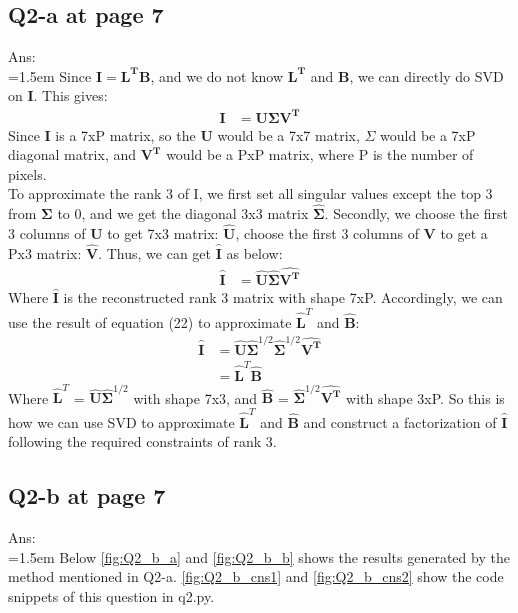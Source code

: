 \documentclass{article}
\begin{document}
	\subsection*{Q2-a at page 7}
	Ans:\\
	\hangindent=1.5em \hspace{1.5em} Since $\mathbf{I} = \mathbf{L^T}\mathbf{B}$, and we do not know $\mathbf{L^T}$ and $\mathbf{B}$, we can directly do SVD on $\mathbf{I}$. This gives:\\
	\begin{align}
		\mathbf{I} &= \mathbf{U}\mathbf{\Sigma}\mathbf{V^T}
	\end{align}
	Since $\mathbf{I}$ is a 7xP matrix, so the $\mathbf{U}$ would be a 7x7 matrix, $\Sigma$ would be a 7xP diagonal matrix, and $\mathbf{V^T}$ would be a PxP matrix, where P is the number of pixels.\\
	To approximate the rank 3 of I, we first set all singular values except the top 3 from $\mathbf{\Sigma}$ to 0, and we get the diagonal 3x3 matrix $\hat{\mathbf{\Sigma}}$. Secondly, we choose the first 3 columns of $\mathbf{U}$ to get 7x3 matrix: $\hat{\mathbf{U}}$, choose the first 3 columns of $\mathbf{V}$ to get a Px3 matrix: $\hat{\mathbf{V}}$. Thus, we can get $\hat{\mathbf{I}}$ as below:
	\begin{align}
		\hat{\mathbf{I}} &= \hat{\mathbf{U}}\hat{\mathbf{\Sigma}}\hat{\mathbf{V^T}}
	\end{align}
	Where $\hat{\mathbf{I}}$ is the reconstructed rank 3 matrix with shape 7xP. Accordingly, we can use the result of equation (22) to approximate $\hat{\mathbf{L}}^T$ and $\hat{\mathbf{B}}$:
	\begin{align}
		\hat{\mathbf{I}} &= \hat{\mathbf{U}}\hat{\mathbf{\Sigma}}^{1/2}\hat{\mathbf{\Sigma}}^{1/2}\hat{\mathbf{V^T}} \\
		                 &= \hat{\mathbf{L}}^T\hat{\mathbf{B}}
	\end{align}
	Where $\hat{\mathbf{L}}^T$ = $\hat{\mathbf{U}}\hat{\mathbf{\Sigma}}^{1/2}$ with shape 7x3, and  $\hat{\mathbf{B}}$ = $\hat{\mathbf{\Sigma}}^{1/2}\hat{\mathbf{V^T}}$ with shape 3xP. So this is how we can use SVD to approximate $\hat{\mathbf{L}}^T$ and $\hat{\mathbf{B}}$ and construct a factorization of $\hat{\mathbf{I}}$ following the required constraints of rank 3.
	
	
	\newpage
	\subsection*{Q2-b at page 7}
	Ans:\\
	\hangindent=1.5em \hspace{1.5em} Below \autoref{fig:Q2_b_a} and \autoref{fig:Q2_b_b} shows the results generated by the method mentioned in Q2-a. \autoref{fig:Q2_b_cns1} and \autoref{fig:Q2_b_cns2} show the code snippets of this question in q2.py.
	\newline
	
\end{document}
